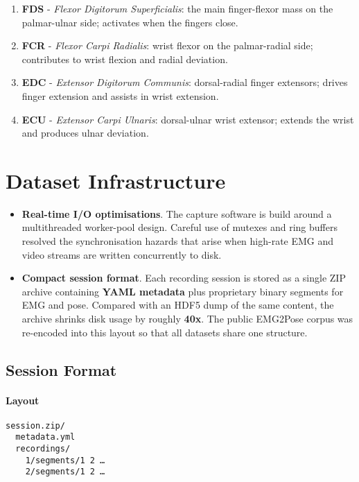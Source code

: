 \begin{enumerate}[label=\alph*]
  \item \textbf{FDS} - \emph{Flexor Digitorum Superficialis}: the main finger-flexor mass on the palmar-ulnar side; activates when the fingers close.
  \item \textbf{FCR} - \emph{Flexor Carpi Radialis}: wrist flexor on the palmar-radial side; contributes to wrist flexion and radial deviation.
  \item \textbf{EDC} - \emph{Extensor Digitorum Communis}: dorsal-radial finger extensors; drives finger extension and assists in wrist extension.
  \item \textbf{ECU} - \emph{Extensor Carpi Ulnaris}: dorsal-ulnar wrist extensor; extends the wrist and produces ulnar deviation.
\end{enumerate}

\section{Dataset Infrastructure}
\begin{itemize}
    \item \textbf{Real-time I/O optimisations}.
          The capture software is build around a multithreaded
          worker-pool design. Careful use of mutexes and ring buffers resolved
          the synchronisation hazards that arise when high-rate EMG and video
          streams are written concurrently to disk.
    \item \textbf{Compact session format}.
          Each recording session is stored as a single ZIP archive containing
          \textbf{YAML metadata} plus proprietary binary segments for EMG and
          pose. Compared with an HDF5 dump of the same content, the archive
          shrinks disk usage by roughly \textbf{40x}. The public EMG2Pose
          corpus was re-encoded into this layout so that all datasets share one
          structure.
\end{itemize}

\subsection{Session Format}

\paragraph{Layout}

\begin{verbatim}
session.zip/
  metadata.yml
  recordings/
    1/segments/1 2 …
    2/segments/1 2 …
\end{verbatim}


